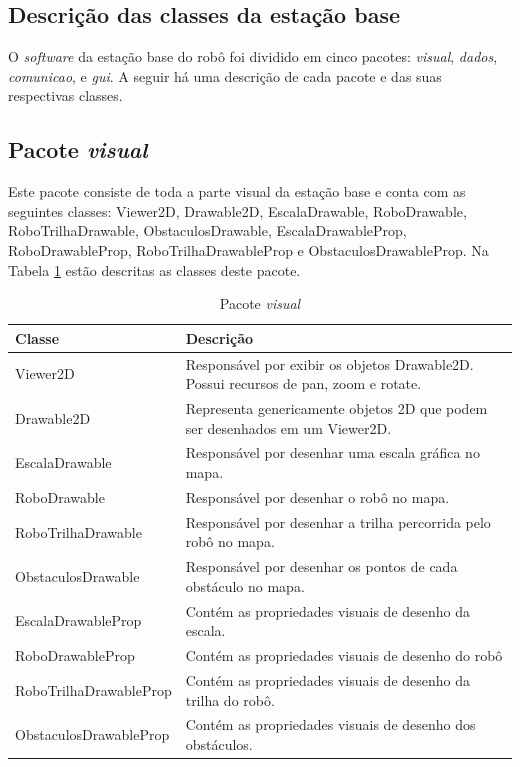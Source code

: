 \subsection{Descrição das classes da estação base}
O \textit{software} da estação base do robô foi dividido em cinco pacotes:  \textit{visual}, \textit{dados}, \textit{comunicao}, e \textit{gui}. A seguir há uma descrição de cada pacote e das suas respectivas classes.


\subsection{Pacote \textit{visual}}

Este pacote consiste de toda a parte visual da estação base e conta com as seguintes classes: Viewer2D, Drawable2D, EscalaDrawable, RoboDrawable, RoboTrilhaDrawable, ObstaculosDrawable, EscalaDrawableProp, RoboDrawableProp, RoboTrilhaDrawableProp e ObstaculosDrawableProp. Na Tabela \ref{tab:pacote_visual} estão descritas as classes deste pacote.


\begin{table}[h]
  \centering
  \caption{Pacote \textit{visual}}
  \begin{tabular}{p{6cm}p{8cm}}
    \toprule
    \textbf{Classe} & \textbf{Descrição} \\
    \midrule
    Viewer2D & Responsável por exibir os objetos Drawable2D. Possui recursos de pan, zoom e rotate.   \\ \hline
    Drawable2D & Representa genericamente objetos 2D que podem ser desenhados em um Viewer2D. \\ \hline
    EscalaDrawable & Responsável por desenhar uma escala gráfica no mapa. \\ \hline
    RoboDrawable & Responsável por desenhar o robô no mapa. \\ \hline
    RoboTrilhaDrawable & Responsável por desenhar a trilha percorrida pelo robô no mapa. \\ \hline
    ObstaculosDrawable & Responsável por desenhar os pontos de cada obstáculo no mapa. \\ \hline
    EscalaDrawableProp & Contém as propriedades visuais de desenho da escala. \\ \hline
    RoboDrawableProp & Contém as propriedades visuais de desenho do robô \\ \hline
    RoboTrilhaDrawableProp & Contém as propriedades visuais de desenho da trilha do robô. \\ \hline
    ObstaculosDrawableProp & Contém as propriedades visuais de desenho dos obstáculos. \\
    \bottomrule
  \end{tabular}%
  \label{tab:pacote_visual}%
\end{table}%

